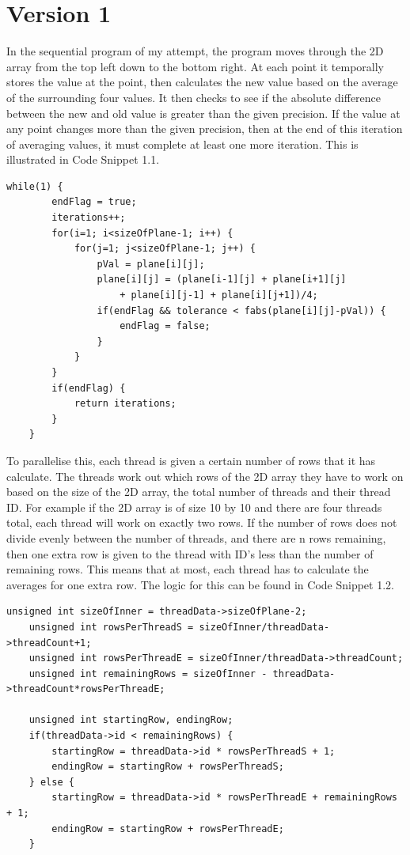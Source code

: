 \documentclass{report}
\begin{document}
\section{Version 1}
In the sequential program of my attempt, the program moves through the 2D array from the top left down to the bottom right. At each point it temporally stores the value at the point, then calculates the new value based on the average of the surrounding four values. It then checks to see if the absolute difference between the new and old value is greater than the given precision. If the value at any point changes more than the given precision, then at the end of this iteration of averaging values, it must complete at least one more iteration. This is illustrated in Code Snippet 1.1.
\begin{lstlisting}[style=customc,caption=Version 1 Sequential Main Loop]
    while(1) {
        endFlag = true;
        iterations++;
        for(i=1; i<sizeOfPlane-1; i++) {
            for(j=1; j<sizeOfPlane-1; j++) {
                pVal = plane[i][j];
                plane[i][j] = (plane[i-1][j] + plane[i+1][j]
                    + plane[i][j-1] + plane[i][j+1])/4;
                if(endFlag && tolerance < fabs(plane[i][j]-pVal)) {
                    endFlag = false;
                }
            }
        }
        if(endFlag) {
            return iterations;
        }
    }
\end{lstlisting}
To parallelise this, each thread is given a certain number of rows that it has calculate. The threads work out which rows of the 2D array they have to work on based on the size of the 2D array, the total number of threads and their thread ID. For example if the 2D array is of size 10 by 10 and there are four threads total, each thread will work on exactly two rows. If the number of rows does not divide evenly between the number of threads, and there are n rows remaining, then one extra row is given to the thread with ID's less than the number of remaining rows. This means that at most, each thread has to calculate the averages for one extra row. The logic for this can be found in Code Snippet 1.2.
\begin{lstlisting}[style=customc,caption=Row Split Logic]
    unsigned int sizeOfInner = threadData->sizeOfPlane-2;
    unsigned int rowsPerThreadS = sizeOfInner/threadData->threadCount+1;
    unsigned int rowsPerThreadE = sizeOfInner/threadData->threadCount;
    unsigned int remainingRows = sizeOfInner - threadData->threadCount*rowsPerThreadE;

    unsigned int startingRow, endingRow;
    if(threadData->id < remainingRows) {
        startingRow = threadData->id * rowsPerThreadS + 1;
        endingRow = startingRow + rowsPerThreadS;
    } else {
        startingRow = threadData->id * rowsPerThreadE + remainingRows + 1;
        endingRow = startingRow + rowsPerThreadE;
    }
\end{lstlisting}
\end{document}
